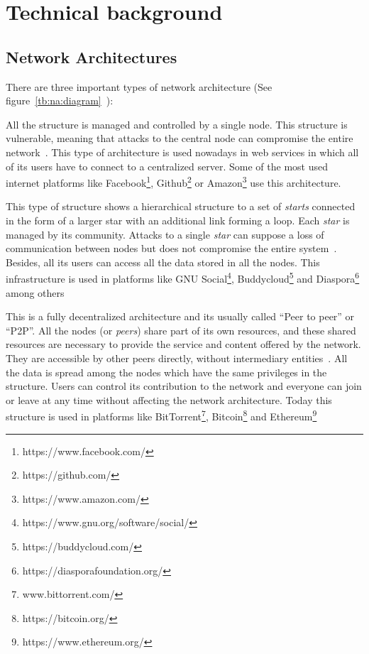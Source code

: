 \section{Technical background}
\label{tb}
\subsection{Network Architectures}
\label{tb:na}


There are three important types of network architecture (See
figure~\ref{tb:na:diagram}~\cite{baran1964distributed}):

\begin{itemize}
   All the structure is managed and controlled
  by a single node. This structure is vulnerable, meaning that attacks to the
  central node can compromise the entire network~\cite{baran1964distributed}.
  This type of architecture is used nowadays in web services in which all of its
  users have to connect to a centralized server. Some of the most used internet
  platforms like Facebook\footnote{https://www.facebook.com/},
  Github\footnote{https://github.com/} or
  Amazon\footnote{https://www.amazon.com/} use this architecture.

  
   This type of structure shows a hierarchical
  structure to a set of \emph{starts} connected in the form of a larger star
  with an additional link forming a loop. Each \emph{star} is managed by its
  community. Attacks to a single \emph{star} can suppose a loss of communication
  between nodes but does not compromise the entire
  system~\cite{baran1964distributed}. Besides, all its users can access all the
  data stored in all the nodes. This infrastructure is used in platforms like
  GNU Social\footnote{https://www.gnu.org/software/social/},
  Buddycloud\footnote{https://buddycloud.com/} and
  Diaspora\footnote{https://diasporafoundation.org/} among others

   This is a fully decentralized architecture
  and its usually called ``Peer to peer'' or ``P2P''. All the nodes (or
  \emph{peers}) share part of its own resources, and these shared resources are
  necessary to provide the service and content offered by the network. They are
  accessible by other peers directly, without intermediary
  entities~\cite{schollmeier2001definition}. All the data is spread among the
  nodes which have the same privileges in the structure. Users can control its
  contribution to the network and everyone can join or leave at any time without
  affecting the network architecture. Today this structure is used in platforms
  like BitTorrent\footnote{www.bittorrent.com/},
  Bitcoin\footnote{https://bitcoin.org/} and
  Ethereum\footnote{https://www.ethereum.org/}
\end{itemize}

